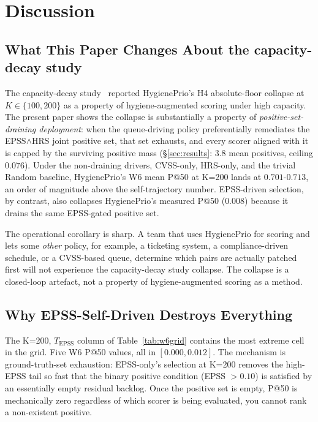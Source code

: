 \section{Discussion}
\label{sec:discussion}

\subsection{What This Paper Changes About the capacity-decay study}

The capacity-decay study~\cite{paper6capacity} reported HygienePrio's H4 absolute-floor
collapse at $K \in \{100, 200\}$ as a property of hygiene-augmented
scoring under high capacity. The present paper shows the collapse is
substantially a property of \textit{positive-set-draining deployment}:
when the queue-driving policy preferentially remediates the
EPSS$\wedge$HRS joint positive set, that set exhausts, and every
scorer aligned with it is capped by the surviving positive mass
(\S\ref{sec:results}: $3.8$ mean positives, ceiling $0.076$).
Under the non-draining drivers, CVSS-only, HRS-only, and the
trivial Random baseline, HygienePrio's W6 mean P@50 at K=200 lands
at $0.701$-$0.713$, an order of magnitude above the self-trajectory
number. EPSS-driven selection, by contrast, also collapses
HygienePrio's measured P@50 ($0.008$) because it drains the same
EPSS-gated positive set.

The operational corollary is sharp. A team that uses HygienePrio for
scoring and lets some \textit{other} policy, for example, a
ticketing system, a compliance-driven schedule, or a CVSS-based
queue, determine which pairs are actually patched first will not
experience the capacity-decay study collapse. The collapse is a closed-loop
artefact, not a property of hygiene-augmented scoring as a method.

\subsection{Why EPSS-Self-Driven Destroys Everything}

The K=200, $T_{\mathrm{EPSS}}$ column of Table~\ref{tab:w6grid} contains
the most extreme cell in the grid. Five W6 P@50 values, all in
$[0.000, 0.012]$. The mechanism is ground-truth-set exhaustion:
EPSS-only's selection at K=200 removes the high-EPSS tail so fast that
the binary positive condition (EPSS $> 0.10$) is satisfied by an
essentially empty residual backlog. Once the positive set is empty,
P@50 is mechanically zero regardless of which scorer is being
evaluated, you cannot rank a non-existent positive.

